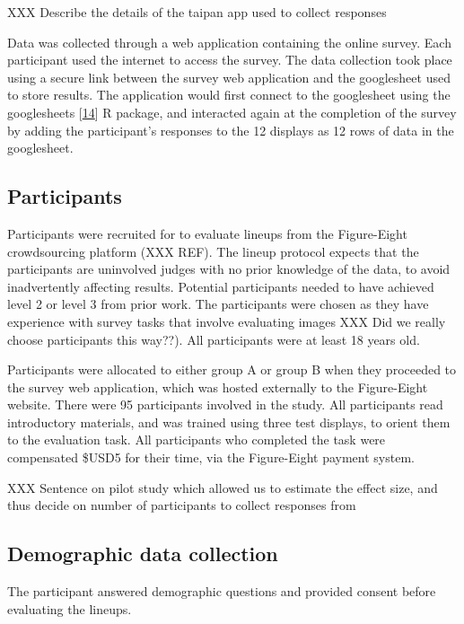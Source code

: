 \documentclass[conference,final,]{IEEEtran}
\begin{document}
XXX Describe the details of the taipan app used to collect responses

Data was collected through a web application containing the online survey.
Each participant used the internet to access the survey.
The data collection took place using a secure link between the survey web application and the googlesheet used to store results. The application would first connect to the googlesheet using the googlesheets {[}\protect\hyperlink{ref-sheets}{14}{]} R package, and interacted again at the completion of the survey by adding the participant's responses to the 12 displays as 12 rows of data in the googlesheet.

\hypertarget{participants}{%
\subsection{Participants}\label{participants}}

Participants were recruited for to evaluate lineups from the Figure-Eight crowdsourcing platform (XXX REF).
The lineup protocol expects that the participants are uninvolved judges with no prior knowledge of the data, to avoid inadvertently affecting results. Potential participants needed to have achieved level 2 or level 3 from prior work. The participants were chosen as they have experience with survey tasks that involve evaluating images XXX Did we really choose participants this way??). All participants were at least 18 years old.

Participants were allocated to either group A or group B when they proceeded to the survey web application, which was hosted externally to the Figure-Eight website. There were 95 participants involved in the study. All participants read introductory materials, and was trained using three test displays, to orient them to the evaluation task. All participants who completed the task were compensated \$USD5 for their time, via the Figure-Eight payment system.

XXX Sentence on pilot study which allowed us to estimate the effect size, and thus decide on number of participants to collect responses from

\hypertarget{demographic-data-collection}{%
\subsection{Demographic data collection}\label{demographic-data-collection}}

The participant answered demographic questions and provided consent before evaluating the lineups.
\end{document}
